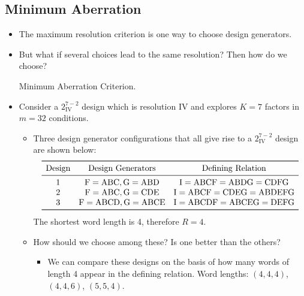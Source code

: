 \subsection{Minimum Aberration}
\begin{itemize}
    \item The maximum resolution criterion is one way to choose design generators.
    \item But what if several choices lead to the same resolution? Then how do we choose?
          \begin{tightcenter}
              Minimum Aberration Criterion.
          \end{tightcenter}
    \item Consider a $ 2^{7-2}_{\text{IV}} $ design which is resolution IV and explores $K = 7$ factors in $m = 32$ conditions.
          \begin{itemize}
              \item Three design generator configurations that all give rise to a $ 2^{7-2}_{\text{IV}} $ design are shown below:
                    \[ \begin{matrix}
                            \toprule
                            \text{Design} & \text{Design Generators}                  & \text{Defining Relation}                       \\
                            \midrule
                            1             & \text{F}=\text{ABC},\text{G}=\text{ABD}   & \text{I}=\text{ABCF}=\text{ABDG}=\text{CDFG}   \\
                            2             & \text{F}=\text{ABC},\text{G}=\text{CDE}   & \text{I}=\text{ABCF}=\text{CDEG}=\text{ABDEFG} \\
                            3             & \text{F}=\text{ABCD},\text{G}=\text{ABCE} & \text{I}=\text{ABCDF}=\text{ABCEG}=\text{DEFG} \\
                            \bottomrule
                        \end{matrix} \]
                    The shortest word length is 4, therefore $ R=4 $.
              \item How should we choose among these? Is one better than the others?
                    \begin{itemize}[*]
                        \item We can compare these designs on the basis of how many words of length 4 appear in the
                              defining relation. Word lengths: $ (4,4,4) $, $ (4,4,6) $, $ (5,5,4) $.

\end{itemize}
\end{itemize}
\end{itemize}
